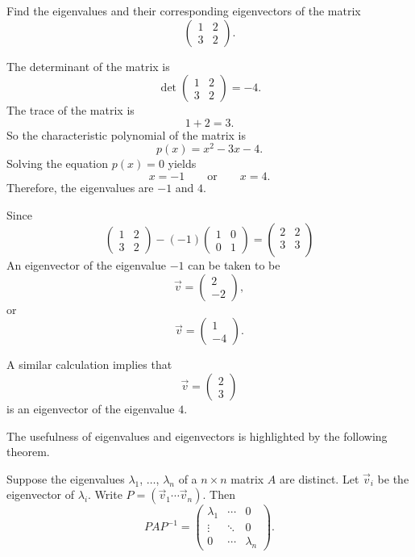 \begin{example}
  Find the eigenvalues and their corresponding eigenvectors of the matrix
  \[
  \begin{pmatrix}
    1 & 2 \\
    3 & 2
  \end{pmatrix}.  
  \]
\end{example}
\begin{solution}
  The determinant of the matrix is
  \[
    \det\begin{pmatrix}
      1 & 2 \\
      3 & 2
    \end{pmatrix}=-4.  
  \]
  The trace of the matrix is
  \[1+2=3.\]
  So the characteristic polynomial of the matrix is
  \[
  p(x)=x^2-3x-4. 
  \]
  Solving the equation $p(x)=0$ yields
  \[
    x=-1 \qquad\text{or}\qquad x=4.
  \]
  Therefore, the eigenvalues are $-1$ and $4$.

  Since
  \[
  \begin{pmatrix}
    1 & 2 \\
    3 & 2
  \end{pmatrix}  - (-1)
  \begin{pmatrix}
    1 & 0\\
    0 & 1
  \end{pmatrix}=
  \begin{pmatrix}
    2 & 2\\
    3 & 3\\
  \end{pmatrix}
  \]
  An eigenvector of the eigenvalue $-1$ can be taken to be
  \[\vec{v}=\begin{pmatrix}
 2\\ -2   
  \end{pmatrix},
  \]
  or 
  \[\vec{v}=\begin{pmatrix}
    1\\ -4   
     \end{pmatrix}.
     \]

  A similar calculation implies that
  \[\vec{v}=\begin{pmatrix}
    2\\ 3   
     \end{pmatrix}\]
 is an eigenvector of the eigenvalue $4$.
\end{solution}

The usefulness of eigenvalues and eigenvectors is highlighted by the following theorem.

\begin{theorem}
  Suppose the eigenvalues $\lambda_1$, $\dots$, $\lambda_n$ of a $n\times n$ matrix $A$ are distinct. Let $\vec{v}_i$ be the eigenvector of $\lambda_i$. Write $P=(\vec{v}_1\cdots \vec{v}_n)$. Then
  \[
    PAP^{-1}=
  \begin{pmatrix}
    \lambda_1 & \cdots & 0\\
    \vdots & \ddots & 0\\
    0 & \cdots & \lambda_n
  \end{pmatrix}.
  \] 
\end{theorem}


